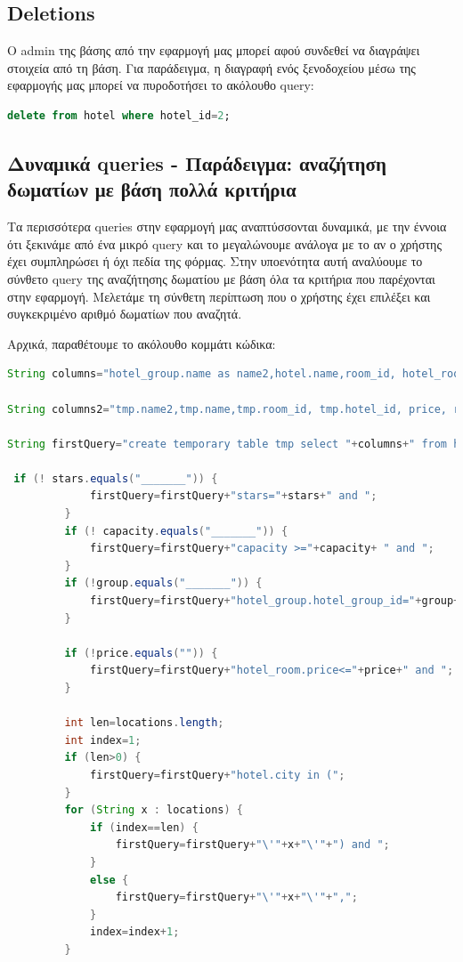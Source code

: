 \documentclass[a4paper,oneside, 11pt]{article}
\begin{document}
\subsection{Deletions}
Ο admin της βάσης από την εφαρμογή μας μπορεί αφού συνδεθεί να διαγράψει στοιχεία από τη βάση. Για παράδειγμα, η διαγραφή ενός ξενοδοχείου μέσω της εφαρμογής μας μπορεί να πυροδοτήσει το ακόλουθο query:
\begin{lstlisting}[language=SQL]
delete from hotel where hotel_id=2;
\end{lstlisting}

\subsection{Δυναμικά queries - Παράδειγμα: αναζήτηση δωματίων με βάση πολλά κριτήρια}
Τα περισσότερα queries στην εφαρμογή μας αναπτύσσονται δυναμικά, με την έννοια ότι ξεκινάμε από ένα μικρό query και το μεγαλώνουμε ανάλογα με το αν ο χρήστης έχει συμπληρώσει ή όχι πεδία της φόρμας. Στην υποενότητα αυτή αναλύουμε το σύνθετο query της αναζήτησης δωματίου με βάση όλα τα κριτήρια που παρέχονται στην εφαρμογή. 
Μελετάμε τη σύνθετη περίπτωση που ο χρήστης έχει επιλέξει και συγκεκριμένο αριθμό δωματίων που αναζητά. 

\bigbreak 
Αρχικά, παραθέτουμε το ακόλουθο κομμάτι κώδικα:
\begin{lstlisting}[language=Java]
String columns="hotel_group.name as name2,hotel.name,room_id, hotel_room.hotel_id, price, repairs_needed, expandable, view, capacity, stars, hotel.hotel_group_id, hotel.street, hotel.num, hotel.postal_code, hotel.city";

String columns2="tmp.name2,tmp.name,tmp.room_id, tmp.hotel_id, price, repairs_needed, expandable, view, capacity, stars, tmp.hotel_group_id, tmp.street, tmp.num, tmp.postal_code, tmp.city";

String firstQuery="create temporary table tmp select "+columns+" from hotel_room inner join hotel on hotel_room.hotel_id=hotel.hotel_id inner join hotel_group on hotel.hotel_group_id=hotel_group.hotel_group_id where (";

 if (! stars.equals("_______")) {
   			 firstQuery=firstQuery+"stars="+stars+" and ";
   		 }
   		 if (! capacity.equals("_______")) {
   			 firstQuery=firstQuery+"capacity >="+capacity+ " and ";
   		 }
   		 if (!group.equals("_______")) {
   			 firstQuery=firstQuery+"hotel_group.hotel_group_id="+group+ " and ";
   		 }
   		 
   		 if (!price.equals("")) {
   			 firstQuery=firstQuery+"hotel_room.price<="+price+" and ";
   		 }

   		 int len=locations.length;
   		 int index=1;
   		 if (len>0) {
   			 firstQuery=firstQuery+"hotel.city in (";
   		 }
   		 for (String x : locations) {
   			 if (index==len) {
   				 firstQuery=firstQuery+"\'"+x+"\'"+") and ";
   			 }
   			 else {
   				 firstQuery=firstQuery+"\'"+x+"\'"+",";
   			 }
   			 index=index+1;
   		 }

\end{lstlisting}
\end{document}

